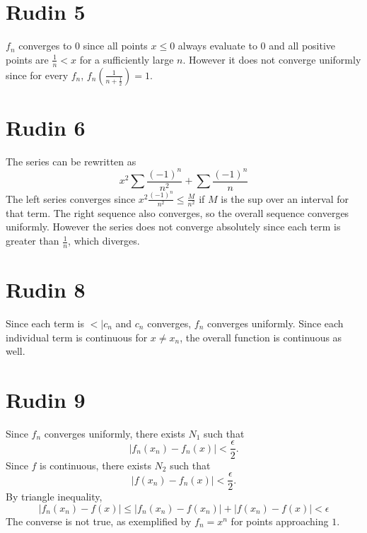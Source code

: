 \documentclass{article}
\begin{document}
\section*{Rudin 5}
$f_n$ converges to 0 since all points $x \leq 0$ always evaluate to $0$
and all positive points are $\frac{1}{n} < x$ for a sufficiently large $n$.
However it does not converge uniformly since for every $f_n$,
$f_n\left(\frac{1}{n+\frac{1}{2}}\right) = 1$.
\newpage 

\section*{Rudin 6}
The series can be rewritten as 
\[
	x^2 \sum \frac{(-1)^n}{n^2} + \sum \frac{(-1)^n}{n}
\]
The left series converges since $x^2\frac{(-1)^n}{n^2} \leq \frac{M}{n^2}$
if $M$ is the sup over an interval for that term.
The right sequence also converges, so the overall sequence converges uniformly.
However the series does not converge absolutely since 
each term is greater than $\frac{1}{n}$, which diverges.
\newpage 

\section*{Rudin 8}
Since each term is $< |c_n$ and $c_n$ converges,
$f_n$ converges uniformly.
Since each individual term is continuous for $x \neq x_n$,
the overall function is continuous as well.
\newpage 

\section*{Rudin 9}
Since $f_n$ converges uniformly, there exists $N_1$ such that
\[
	|f_n(x_n) - f_n(x)| < \frac{\epsilon}{2}.
\]
Since $f$ is continuous, there exists $N_2$ such that
\[
	|f(x_n) - f_n(x)| < \frac{\epsilon}{2}.
\] 
By triangle inequality,
\[
	|f_n(x_n) - f(x)| \leq |f_n(x_n) - f(x_n)| + |f(x_n) - f(x)| < \epsilon
\]
The converse is not true, as exemplified by $f_n = x^n$ for points approaching $1$.
\end{document}
